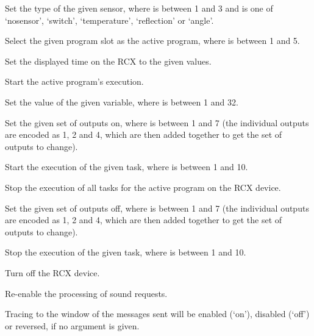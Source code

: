   Set the type of the given sensor, where  is between 1 and 3 and  is one of `nosensor',
  `switch', `temperature', `reflection' or `angle'.
  
  Select the given program slot as the active program, where  is between 1 and 5.
  
  Set the displayed time on the RCX to the given values.
  
  Start the active program's execution.
  
  Set the value of the given variable, where  is between 1 and 32.
  
  Set the given set of outputs on, where  is between 1 and 7
  (the individual outputs are encoded as 1, 2 and 4, which are then added together to get the set of outputs to change).
  
  Start the execution of the given task, where  is between 1 and 10.
  
  Stop the execution of all tasks for the active program on the RCX device.

  Set the given set of outputs off, where  is between 1 and 7
  (the individual outputs are encoded as 1, 2 and 4, which are then added together to get the set of outputs to change).
  
  Stop the execution of the given task, where  is between 1 and 10.
  
  Turn off the RCX device.
  
  Re-enable the processing of sound requests.

  Tracing to the \MaxName{} window of the messages sent will be enabled (`on'), disabled (`off') or reversed, if no argument is given.
  
  \objListCmdEnd

\objItemFile

\objItemMessage


